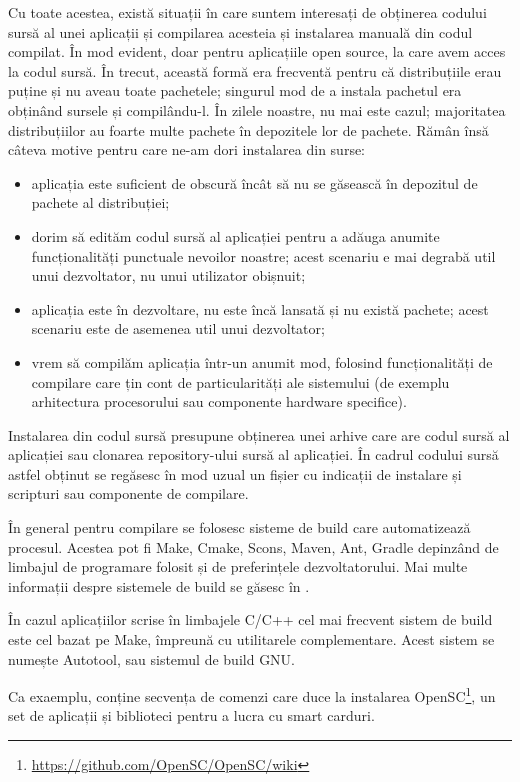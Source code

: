 Cu toate acestea, există situații în care suntem interesați de obținerea codului sursă al unei aplicații și compilarea acesteia și instalarea manuală din codul compilat.
În mod evident, doar pentru aplicațiile open source, la care avem acces la codul sursă.
În trecut, această formă era frecventă pentru că distribuțiile erau puține și nu aveau toate pachetele;
singurul mod de a instala pachetul era obținând sursele și compilându-l.
În zilele noastre, nu mai este cazul;
majoritatea distribuțiilor au foarte multe pachete în depozitele lor de pachete.
Rămân însă câteva motive pentru care ne-am dori instalarea din surse:

\begin{itemize}
  \item aplicația este suficient de obscură încât să nu se găsească în depozitul de pachete al distribuției;
  \item dorim să edităm codul sursă al aplicației pentru a adăuga anumite funcționalități punctuale nevoilor noastre;
    acest scenariu e mai degrabă util unui dezvoltator, nu unui utilizator obișnuit;
  \item aplicația este în dezvoltare, nu este încă lansată și nu există pachete;
    acest scenariu este de asemenea util unui dezvoltator;
  \item vrem să compilăm aplicația într-un anumit mod, folosind funcționalități de compilare care țin cont de particularități ale sistemului (de exemplu arhitectura procesorului sau componente hardware specifice).
\end{itemize}

Instalarea din codul sursă presupune obținerea unei arhive care are codul sursă al aplicației sau clonarea repository-ului sursă al aplicației.
În cadrul codului sursă astfel obținut se regăsesc în mod uzual un fișier  cu indicații de instalare și scripturi sau componente de compilare.

În general pentru compilare se folosesc sisteme de build care automatizează procesul.
Acestea pot fi Make, Cmake, Scons, Maven, Ant, Gradle depinzând de limbajul de programare folosit și de preferințele dezvoltatorului.
Mai multe informații despre sistemele de build se găsesc în .

În cazul aplicațiilor scrise în limbajele C/C++ cel mai frecvent sistem de build este cel bazat pe Make, împreună cu utilitarele complementare.
Acest sistem se numește Autotool, sau sistemul de build GNU.

Ca exaemplu,  conține secvența de comenzi care duce la instalarea OpenSC\footnote{\url{https://github.com/OpenSC/OpenSC/wiki}}, un set de aplicații și biblioteci pentru a lucra cu smart carduri.


